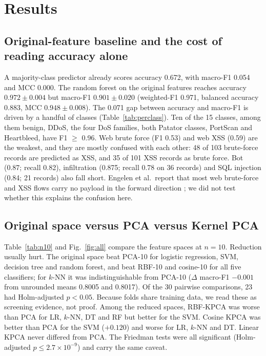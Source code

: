 \documentclass[runningheads]{llncs}
\begin{document}
\section{Results}
\subsection{Original-feature baseline and the cost of reading accuracy alone}
A majority-class predictor already scores accuracy 0.672, with macro-F1 0.054 and MCC 0.000. The random forest on the original features reaches accuracy $0.972\pm0.004$ but macro-F1 $0.901\pm0.020$ (weighted-F1 0.971, balanced accuracy 0.883, MCC $0.948\pm0.008$). The 0.071 gap between accuracy and macro-F1 is driven by a handful of classes (Table~\ref{tab:perclass}). Ten of the 15 classes, among them benign, DDoS, the four DoS families, both Patator classes, PortScan and Heartbleed, have F1 $\ge$ 0.96. Web brute force (F1 0.53) and web XSS (0.59) are the weakest, and they are mostly confused with each other: 48 of 103 brute-force records are predicted as XSS, and 35 of 101 XSS records as brute force. Bot (0.87; recall 0.82), infiltration (0.875; recall 0.78 on 36 records) and SQL injection (0.84; 21 records) also fall short. Engelen et al.\ report that most web brute-force and XSS flows carry no payload in the forward direction \cite{engelen2021}; we did not test whether this explains the confusion here.

\begin{table}[!htbp]
\caption{Per-class results of the selected model (RF, original features), pooled out-of-fold predictions, first repeat.}\label{tab:perclass}
\centering\scriptsize

\end{table}





\subsection{Original space versus PCA versus Kernel PCA}
Table~\ref{tab:n10} and Fig.~\ref{fig:all} compare the feature spaces at $n=10$. Reduction usually hurt. The original space beat PCA-10 for logistic regression, SVM, decision tree and random forest, and beat RBF-10 and cosine-10 for all five classifiers; for $k$-NN it was indistinguishable from PCA-10 ($\Delta$ macro-F1 $-0.001$ from unrounded means 0.8005 and 0.8017). Of the 30 pairwise comparisons, 23 had Holm-adjusted $p<0.05$. Because folds share training data, we read these as screening evidence, not proof. Among the reduced spaces, RBF-KPCA was worse than PCA for LR, $k$-NN, DT and RF but better for the SVM. Cosine KPCA was better than PCA for the SVM ($+0.120$) and worse for LR, $k$-NN and DT. Linear KPCA never differed from PCA. The Friedman tests were all significant (Holm-adjusted $p\le 2.7\times10^{-9}$) and carry the same caveat.
\end{document}
